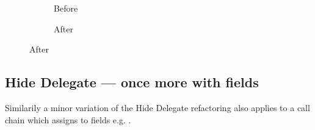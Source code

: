 \begin{figure}
  \centering
  \begin{subfigure}[b]{.4\linewidth}
    
    \caption{Before}
    \label{lst:HideDelegate-nofields-resource-refinity}
  \end{subfigure}\hspace{1cm}
  \begin{subfigure}[b]{.4\linewidth}
    
    \caption{After}
    \label{lst:HideDelegate-nofields-owner-refinity}
  \end{subfigure}
\label{lst:HideDelegate-nofields-classes-refinity}
\end{figure}

\subsection*{Hide Delegate --- once more with fields}

Similarily a minor variation of the  Hide Delegate refactoring also applies to a call chain which assigns to fields
e.g. .



